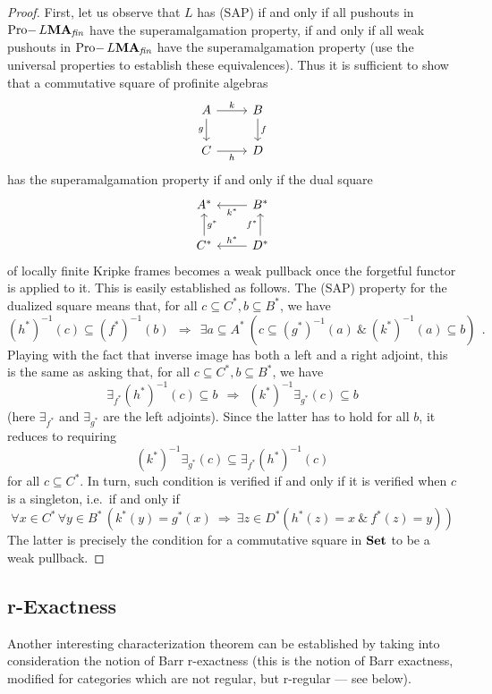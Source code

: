 \documentclass{article}
\theoremstyle{definition}
\DeclareMathOperator{\Pro}{Pro-}
\newcommand{\MA}{\textup{\textbf{MA}}}
\newcommand{\fin}{\textit{fin}}
\newcommand{\Set}{\textup{\textbf{Set}}}
\begin{document}
\begin{proof}
First, let us observe that $L$ has (SAP) if and only if all pushouts in $\Pro L\MA_\fin$ have the superamalgamation property, if and only if all weak pushouts in $\Pro L\MA_\fin$ have the superamalgamation property (use the universal properties to establish these equivalences). Thus it is sufficient to show that a commutative square of profinite algebras 
    \[\begin{tikzcd}
	A & B \\
	C & D
	\arrow["k", from=1-1, to=1-2]
	\arrow["g"', from=1-1, to=2-1]
	\arrow["f", from=1-2, to=2-2]
	\arrow["h"', from=2-1, to=2-2]
    \end{tikzcd}\]
    has the superamalgamation property if and only if the dual square 
    \[\begin{tikzcd}
	A^* & B^* \\
	C^* & D^*
	\arrow["k^*", from=1-2, to=1-1]
	\arrow["g^*"', from=2-1, to=1-1]
	\arrow["f^*", from=2-2, to=1-2]
	\arrow["h^*"', from=2-2, to=2-1]
    \end{tikzcd}\]
     of locally finite Kripke frames becomes a weak pullback once the forgetful functor is applied to it.
     This is easily established as follows. The (SAP) property for the dualized square means that, for all $c\subseteq C^*, b\subseteq B^*$, we have
     $$
     (h^*)^{-1}(c) \subseteq (f^*)^{-1}(b)~~\Rightarrow~~
     \exists a\subseteq A^*~(c\subseteq  (g^*)^{-1}(a)~\&~
      (k^*)^{-1}(a)\subseteq b)~~.
     $$
     Playing with the fact that inverse image has both a left and a right adjoint, this is the same as asking that, for all $c\subseteq C^*, b\subseteq B^*$, we have 
     $$
     \exists_{f^*}(h^*)^{-1}(c)\subseteq b 
     ~~\Rightarrow~~(k^*)^{-1}\exists_{g^*}(c)\subseteq b 
     $$
     (here $\exists_{f^*}$ and $\exists_{g^*}$ are the left adjoints). Since the latter has to hold for all $b$, it reduces to requiring 
     $$
     (k^*)^{-1}\exists_{g^*}(c) \subseteq  \exists_{f^*}(h^*)^{-1}(c)
     $$
     for all $c\subseteq C^*$. In turn, such condition is verified if and only if it is verified when $c$ is a singleton, i.e.\ if and only if
     $$
     \forall x\in C^*\, \forall y\in B^*\,(k^*(y)=g^*(x) 
     ~\Rightarrow~\exists z\in D^* (h^*(z)=x ~\&~f^*(z)=y))
     $$
     The latter  is precisely the condition for a commutative square in $\Set$ to be a weak pullback.
\end{proof}

\subsection{r-Exactness}
Another interesting characterization theorem can be established by taking into consideration the notion of Barr r-exactness (this is the notion of Barr exactness, modified for categories which are not regular, but r-regular --- see below). 
\end{document}
